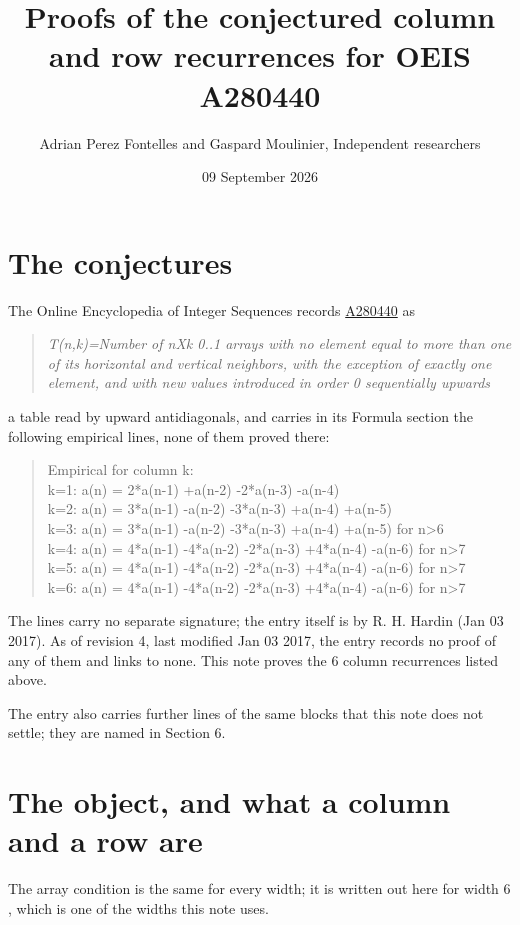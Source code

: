\documentclass[11pt]{article}
\title{Proofs of the conjectured column and row recurrences for OEIS A280440}
\author{Adrian Perez Fontelles and Gaspard Moulinier, Independent researchers}
\date{09 September 2026}
\theoremstyle{definition}
\begin{document}
\maketitle
\section{The conjectures}

The Online Encyclopedia of Integer Sequences records \href{https://oeis.org/A280440}{A280440} as

\begin{quote}\itshape T(n,k)=Number of nXk 0..1 arrays with no element equal to more than one of its horizontal and vertical neighbors, with the exception of exactly one element, and with new values introduced in order 0 sequentially upwards\end{quote}

a table read by upward antidiagonals, and carries in its Formula section the following empirical lines, none of them proved there:

\begin{quote}\ttfamily Empirical for column k:\\
k=1: a(n) = 2*a(n-1) +a(n-2) -2*a(n-3) -a(n-4)\\k=2: a(n) = 3*a(n-1) -a(n-2) -3*a(n-3) +a(n-4) +a(n-5)\\k=3: a(n) = 3*a(n-1) -a(n-2) -3*a(n-3) +a(n-4) +a(n-5) for n>6\\k=4: a(n) = 4*a(n-1) -4*a(n-2) -2*a(n-3) +4*a(n-4) -a(n-6) for n>7\\k=5: a(n) = 4*a(n-1) -4*a(n-2) -2*a(n-3) +4*a(n-4) -a(n-6) for n>7\\k=6: a(n) = 4*a(n-1) -4*a(n-2) -2*a(n-3) +4*a(n-4) -a(n-6) for n>7\end{quote}

The lines carry no separate signature; the entry itself is by R. H. Hardin (Jan 03 2017). As of revision 4, last modified Jan 03 2017, the entry records no proof of any of them and links to none. This note proves the 6 column recurrences listed above.

The entry also carries further lines of the same blocks that this note does not settle; they are named in Section 6.

\section{The object, and what a column and a row are}

The array condition is the same for every width; it is written out here for width $6$, which is one of the widths this note uses.
\end{document}
